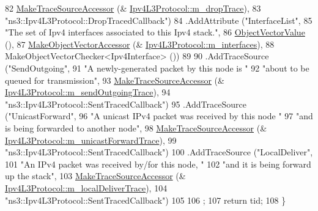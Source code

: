 \begin{DoxyCode}
82                      \hyperlink{group__tracing_gab21a770b9855af4e8f69f7531ea4a6b0}{MakeTraceSourceAccessor} (&
      \hyperlink{classns3_1_1Ipv4L3Protocol_a80984e2de6a2562b04195b975014cb1b}{Ipv4L3Protocol::m\_dropTrace}),
83                      \textcolor{stringliteral}{"ns3::Ipv4L3Protocol::DropTracedCallback"})
84     .AddAttribute (\textcolor{stringliteral}{"InterfaceList"},
85                    \textcolor{stringliteral}{"The set of Ipv4 interfaces associated to this Ipv4 stack."},
86                    \hyperlink{namespacens3_a5de726d8bcea7a51fd68ce5167a66713}{ObjectVectorValue} (),
87                    \hyperlink{namespacens3_a6ad5b3621a5dc72b7030cbb07c73adf6}{MakeObjectVectorAccessor} (&
      \hyperlink{classns3_1_1Ipv4L3Protocol_a0b0f15b24a02f2c9a5d576f633aa2770}{Ipv4L3Protocol::m\_interfaces}),
88                    MakeObjectVectorChecker<Ipv4Interface> ())
89 
90     .AddTraceSource (\textcolor{stringliteral}{"SendOutgoing"},
91                      \textcolor{stringliteral}{"A newly-generated packet by this node is "}
92                      \textcolor{stringliteral}{"about to be queued for transmission"},
93                      \hyperlink{group__tracing_gab21a770b9855af4e8f69f7531ea4a6b0}{MakeTraceSourceAccessor} (&
      \hyperlink{classns3_1_1Ipv4L3Protocol_a909297aa7ca87db2b7c91daefa2ed40a}{Ipv4L3Protocol::m\_sendOutgoingTrace}),
94                      \textcolor{stringliteral}{"ns3::Ipv4L3Protocol::SentTracedCallback"})
95     .AddTraceSource (\textcolor{stringliteral}{"UnicastForward"},
96                      \textcolor{stringliteral}{"A unicast IPv4 packet was received by this node "}
97                      \textcolor{stringliteral}{"and is being forwarded to another node"},
98                      \hyperlink{group__tracing_gab21a770b9855af4e8f69f7531ea4a6b0}{MakeTraceSourceAccessor} (&
      \hyperlink{classns3_1_1Ipv4L3Protocol_acc97efd317fd7e0c1a65c6247fa6537a}{Ipv4L3Protocol::m\_unicastForwardTrace}),
99                      \textcolor{stringliteral}{"ns3::Ipv4L3Protocol::SentTracedCallback"})
100     .AddTraceSource (\textcolor{stringliteral}{"LocalDeliver"},
101                      \textcolor{stringliteral}{"An IPv4 packet was received by/for this node, "}
102                      \textcolor{stringliteral}{"and it is being forward up the stack"},
103                      \hyperlink{group__tracing_gab21a770b9855af4e8f69f7531ea4a6b0}{MakeTraceSourceAccessor} (&
      \hyperlink{classns3_1_1Ipv4L3Protocol_a70adc805da9b70e8fb6f2a998f4df446}{Ipv4L3Protocol::m\_localDeliverTrace}),
104                      \textcolor{stringliteral}{"ns3::Ipv4L3Protocol::SentTracedCallback"})
105 
106   ;
107   \textcolor{keywordflow}{return} tid;
108 \}
\end{DoxyCode}



